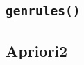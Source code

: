 % 
%

%



\subsection{\texttt{genrules()}}
\label{sec:arm:ar:genrules}




\subsection{Apriori2}
\label{sec:arm:ar:apriori2}





% 
